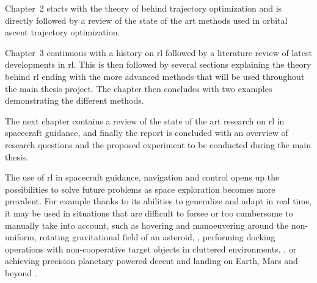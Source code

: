 Chapter~2 starts with the theory of behind trajectory optimization and is directly followed by a review of the state of the art methods used in orbital ascent trajectory optimization.

Chapter~3 continuous with a history on \acrshort{rl} followed by a literature review of latest developments in \acrshort{rl}. This is then followed by several sections explaining the theory behind \acrshort{rl} ending with the more advanced methods that will be used throughout the main thesis project. The chapter then concludes with two examples demonstrating the different methods.

The next chapter contains a review of the state of the art research on \acrshort{rl} in spacecraft guidance, and finally the report is concluded with an overview of research questions and the proposed experiment to be conducted during the main thesis.

The use of \acrshort{rl} in spacecraft guidance, navigation and control opens up the possibilities to solve future problems as space exploration becomes more prevalent. For example thanks to its abilities to generalize and adapt in real time, it may be used in situations that are difficult to forsee or too cumbersome to manually take into account, such as hovering and manoeuvering around the non-uniform, rotating gravitational field of an asteroid, \cite{gaudet2012robust, willis2016reinforcement}, performing docking operations with non-cooperative target objects in cluttered environments, \cite{hovell2020deep, hovell2021deep, broida2019spacecraft}, or achieving precision planetary powered decent and landing on Earth, Mars and beyond \cite{gaudet2018deep}.
